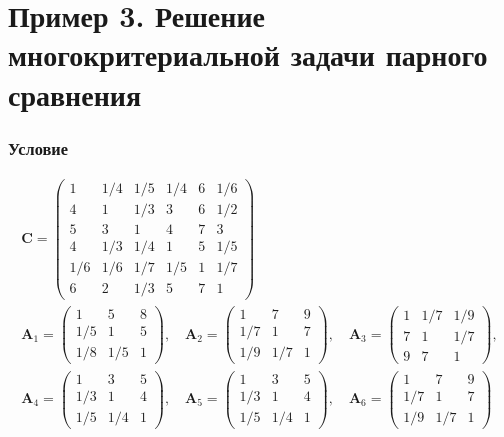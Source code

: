 \documentclass[specialist,
	substylefile = spbu.rtx,
	subf,href,colorlinks=true, 12pt]{disser}
\begin{document}
\section{Пример 3. Решение многокритериальной задачи парного сравнения} \label{appendix:full}

\subsubsection{Условие}
$$
	\begin{array}{l}
		\mathbf{C}=\left(\begin{array}{cccccc}
				1     & 1 / 4 & 1 / 5 & 1 / 4 & 6 & 1 / 6 \\
				4     & 1     & 1 / 3 & 3     & 6 & 1 / 2 \\
				5     & 3     & 1     & 4     & 7 & 3     \\
				4     & 1 / 3 & 1 / 4 & 1     & 5 & 1 / 5 \\
				1 / 6 & 1 / 6 & 1 / 7 & 1 / 5 & 1 & 1 / 7 \\
				6     & 2     & 1 / 3 & 5     & 7 & 1
			\end{array}\right)                                                                                                                \\
		\mathbf{A}_{1}=\left(\begin{array}{ccc}
				1     & 5     & 8 \\
				1 / 5 & 1     & 5 \\
				1 / 8 & 1 / 5 & 1
			\end{array}\right), \quad \mathbf{A}_{2}=\left(\begin{array}{ccc}
				1     & 7     & 9 \\
				1 / 7 & 1     & 7 \\
				1 / 9 & 1 / 7 & 1
			\end{array}\right), \quad \mathbf{A}_{3}=\left(\begin{array}{ccc}
				1 & 1 / 7 & 1 / 9 \\
				7 & 1     & 1 / 7 \\
				9 & 7     & 1
			\end{array}\right), \\
		\mathbf{A}_{4}=\left(\begin{array}{ccc}
				1     & 3     & 5 \\
				1 / 3 & 1     & 4 \\
				1 / 5 & 1 / 4 & 1
			\end{array}\right), \quad \mathbf{A}_{5}=\left(\begin{array}{ccc}
				1     & 3     & 5 \\
				1 / 3 & 1     & 4 \\
				1 / 5 & 1 / 4 & 1
			\end{array}\right), \quad \mathbf{A}_{6}=\left(\begin{array}{ccc}
				1     & 7     & 9 \\
				1 / 7 & 1     & 7 \\
				1 / 9 & 1 / 7 & 1
			\end{array}\right)
	\end{array}
$$
\end{document}
